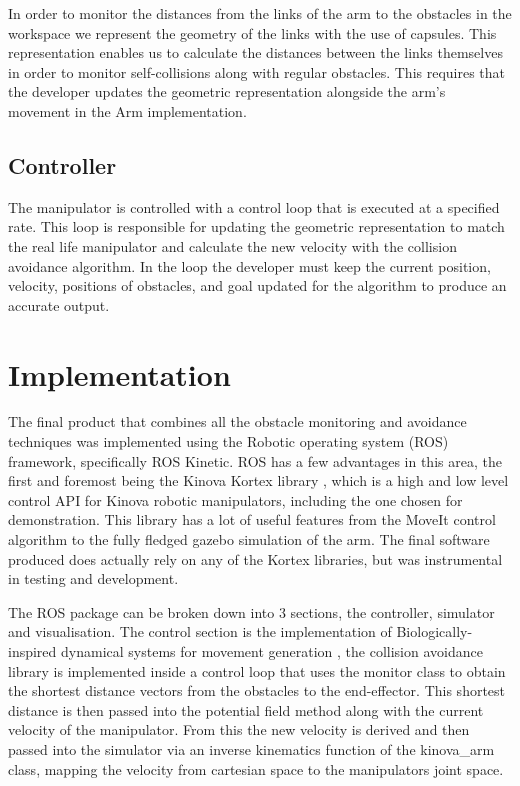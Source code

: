\documentclass[a4paper, 10pt, conference]{ieeeconf}      %
\begin{document}
In order to monitor the distances from the links of the arm to the obstacles in the workspace we represent the geometry of the links with the use of capsules. This representation enables us to calculate the distances between the links themselves in order to monitor self-collisions along with regular obstacles. This requires that the developer updates the geometric representation alongside the arm’s movement in the Arm implementation. 

\subsection{Controller} %

The manipulator is controlled with a control loop that is executed at a specified rate. This loop is responsible for updating the geometric representation to match the real life manipulator and calculate the new velocity with the collision avoidance algorithm. In the loop the developer must keep the current position, velocity, positions of obstacles, and goal updated for the algorithm to produce an accurate output. 
 
 
\section{Implementation} %
The final product that combines all the obstacle monitoring and avoidance techniques was implemented using the Robotic operating system (ROS) framework, specifically ROS Kinetic. ROS has a few advantages in this area, the first and foremost being the Kinova Kortex library \cite{kortex}, which is a high and low level control API for Kinova robotic manipulators, including the one chosen for demonstration. This library has a lot of useful features from the MoveIt control algorithm to the fully fledged gazebo simulation of the arm. The final software produced does actually rely on any of the Kortex libraries, but was instrumental in testing and development.

The ROS package can be broken down into 3 sections, the controller, simulator and visualisation. The control section is the implementation of Biologically-inspired dynamical systems for movement generation \cite{Hoffmann}, the collision avoidance library is implemented inside a control loop that uses the monitor class to obtain the shortest distance vectors from the obstacles to the end-effector. This shortest distance is then passed into the potential field method along with the current velocity of the manipulator. From this the new velocity is derived and then passed into the simulator via an inverse kinematics function of the kinova\_arm class, mapping the velocity from cartesian space to the manipulators joint space.
\end{document}
